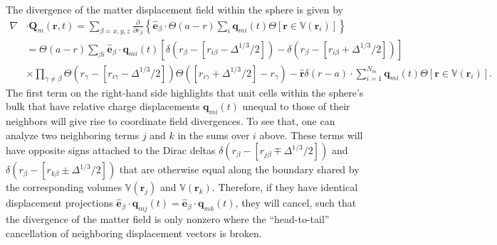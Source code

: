 \documentclass{article}
\begin{document}
The divergence of the matter displacement field within the sphere is given by
\begin{equation}
\begin{split}
\nabla&\cdot\mathbf{Q}_m(\mathbf{r},t) = \sum_{\beta = x,y,z}\frac{\partial}{\partial r_\beta}\left\{\hat{\mathbf{e}}_\beta\cdot\Theta(a - r)\sum_i\mathbf{q}_{mi}(t)\Theta[\mathbf{r}\in\mathbb{V}(\mathbf{r}_i)]\right\}\\
&= \Theta(a - r)\sum_{\beta i}\hat{\mathbf{e}}_\beta\cdot\mathbf{q}_{mi}(t)\left[\delta(r_\beta - [r_{i\beta} - \Delta^{1/3}/2]) - \delta(r_\beta - [r_{i\beta} + \Delta^{1/3}/2])\right]\\
&\times\prod_{\gamma\neq\beta}\Theta(r_\gamma - [r_{i\gamma} - \Delta^{1/3}/2])\Theta([r_{i\gamma} + \Delta^{1/3}/2] - r_\gamma) - \hat{\mathbf{r}}\delta(r - a)\cdot\sum_{i = 1}^{N_m}\mathbf{q}_{mi}(t)\Theta[\mathbf{r}\in\mathbb{V}(\mathbf{r}_i)].
\end{split}
\end{equation}
The first term on the right-hand side highlights that unit cells within the sphere's bulk that have relative charge displacements $\mathbf{q}_{mi}(t)$ unequal to those of their neighbors will give rise to coordinate field divergences. To see that, one can analyze two neighboring terms $j$ and $k$ in the sums over $i$ above. These terms will have opposite signs attached to the Dirac deltas $\delta(r_\beta - [r_{j\beta} \mp \Delta^{1/3}/2])$ and $\delta(r_\beta - [r_{k\beta} \pm \Delta^{1/3}/2])$ that are otherwise equal along the boundary shared by the corresponding volumes $\mathbb{V}(\mathbf{r}_j)$ and $\mathbb{V}(\mathbf{r}_k)$. Therefore, if they have identical displacement projections $\hat{\mathbf{e}}_\beta\cdot\mathbf{q}_{mj}(t) = \hat{\mathbf{e}}_\beta\cdot\mathbf{q}_{mk}(t)$, they will cancel, such that the divergence of the matter field is only nonzero where the ``head-to-tail'' cancellation of neighboring displacement vectors is broken.
\end{document}
